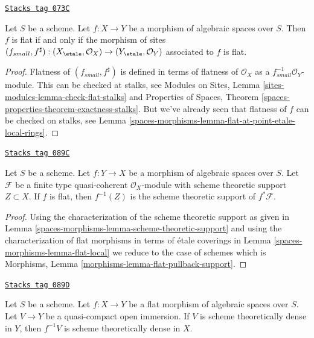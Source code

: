 \begin{lemma}
\label{spaces-morphisms-lemma-flat-morphism-sites}
\href{https://stacks.math.columbia.edu/tag/073C}{\texttt{Stacks tag 073C}}

Let $S$ be a scheme.
Let $f : X \to Y$ be a morphism of algebraic spaces over $S$.
Then $f$ is flat if and only if the morphism of sites
$
(f_{small}, f^\sharp) :
(X_\etale, \mathcal{O}_X)
\to
(Y_\etale, \mathcal{O}_Y)
$
associated to $f$ is flat.
\end{lemma}

\begin{proof}
Flatness of $(f_{small}, f^\sharp)$ is defined in terms of
flatness of $\mathcal{O}_X$ as a $f_{small}^{-1}\mathcal{O}_Y$-module.
This can be checked at stalks, see
Modules on Sites, Lemma \ref{sites-modules-lemma-check-flat-stalks}
and
Properties of Spaces, Theorem \ref{spaces-properties-theorem-exactness-stalks}.
But we've already seen that flatness of $f$ can be checked on stalks, see
Lemma \ref{spaces-morphisms-lemma-flat-at-point-etale-local-rings}.
\end{proof}

\begin{lemma}
\label{spaces-morphisms-lemma-flat-pullback-support}
\href{https://stacks.math.columbia.edu/tag/089C}{\texttt{Stacks tag 089C}}

Let $S$ be a scheme. Let $f : Y \to X$ be a morphism of algebraic spaces
over $S$. Let $\mathcal{F}$ be a finite type quasi-coherent
$\mathcal{O}_X$-module with scheme theoretic support $Z \subset X$.
If $f$ is flat, then $f^{-1}(Z)$ is the scheme theoretic support of
$f^*\mathcal{F}$.
\end{lemma}

\begin{proof}
Using the characterization of the scheme theoretic support
as given in Lemma \ref{spaces-morphisms-lemma-scheme-theoretic-support}
and using the characterization of flat morphisms in terms of
\'etale coverings in Lemma \ref{spaces-morphisms-lemma-flat-local}
we reduce to the case of schemes which is
Morphisms, Lemma \ref{morphisms-lemma-flat-pullback-support}.
\end{proof}

\begin{lemma}
\label{spaces-morphisms-lemma-flat-morphism-scheme-theoretically-dense-open}
\href{https://stacks.math.columbia.edu/tag/089D}{\texttt{Stacks tag 089D}}

Let $S$ be a scheme.
Let $f : X \to Y$ be a flat morphism of algebraic spaces over $S$.
Let $V \to Y$ be a quasi-compact open immersion. If $V$
is scheme theoretically dense in $Y$, then $f^{-1}V$
is scheme theoretically dense in $X$.
\end{lemma}

